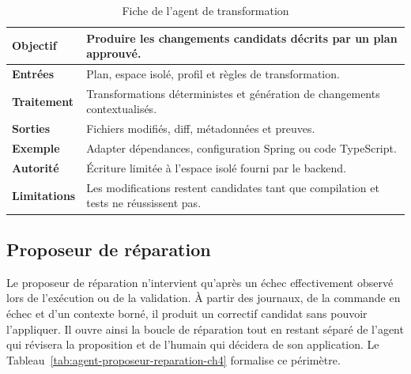 \begin{table}[H]
    \centering
    \caption{Fiche de l'agent de transformation}
    \label{tab:agent-transformation-ch4}
    \small
    \begin{tabularx}{\textwidth}{|>{\bfseries\RaggedRight\arraybackslash}p{3.1cm}|>{\RaggedRight\arraybackslash}X|}
        \hline
        Objectif & Produire les changements candidats décrits par un plan approuvé. \\
        \hline
        Entrées & Plan, espace isolé, profil et règles de transformation. \\
        \hline
        Traitement & Transformations déterministes et génération de changements contextualisés. \\
        \hline
        Sorties & Fichiers modifiés, diff, métadonnées et preuves. \\
        \hline
        Exemple & Adapter dépendances, configuration Spring ou code TypeScript. \\
        \hline
        Autorité & Écriture limitée à l'espace isolé fourni par le backend. \\
        \hline
        Limitations & Les modifications restent candidates tant que compilation et tests ne réussissent pas. \\
        \hline
    \end{tabularx}
\end{table}

\subsection{Proposeur de réparation}

Le proposeur de réparation n'intervient qu'après un échec effectivement observé lors de l'exécution ou de la validation. À partir des journaux, de la commande en échec et d'un contexte borné, il produit un correctif candidat sans pouvoir l'appliquer. Il ouvre ainsi la boucle de réparation tout en restant séparé de l'agent qui révisera la proposition et de l'humain qui décidera de son application. Le Tableau~\ref{tab:agent-proposeur-reparation-ch4} formalise ce périmètre.

